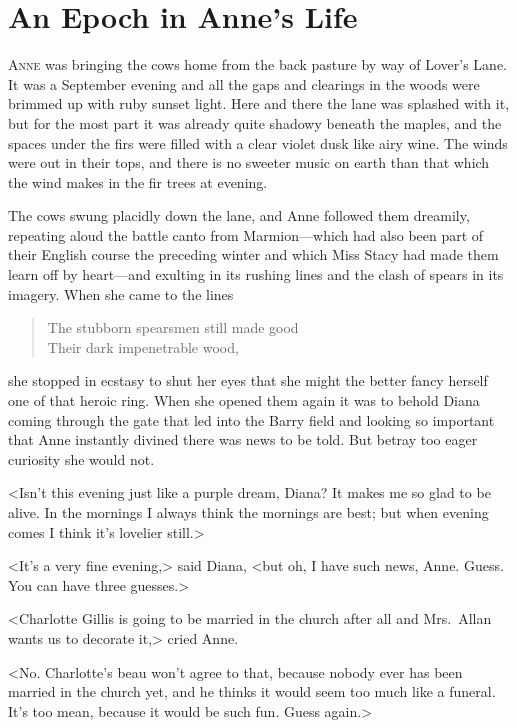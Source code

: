 \chapter{An Epoch in Anne's Life}

\lettrine{A}{nne} was bringing the cows home from the back pasture by way of Lover's Lane. It was a September evening and all the gaps and clearings in the woods were brimmed up with ruby sunset light. Here and there the lane was splashed with it, but for the most part it was already quite shadowy beneath the maples, and the spaces under the firs were filled with a clear violet dusk like airy wine. The winds were out in their tops, and there is no sweeter music on earth than that which the wind makes in the fir trees at evening.

The cows swung placidly down the lane, and Anne followed them dreamily, repeating aloud the battle canto from Marmion—which had also been part of their English course the preceding winter and which Miss Stacy had made them learn off by heart—and exulting in its rushing lines and the clash of spears in its imagery. When she came to the lines

\begin{verse}
The stubborn spearsmen still made good\\
Their dark impenetrable wood,\\
\end{verse}

she stopped in ecstasy to shut her eyes that she might the better fancy herself one of that heroic ring. When she opened them again it was to behold Diana coming through the gate that led into the Barry field and looking so important that Anne instantly divined there was news to be told. But betray too eager curiosity she would not.

<Isn't this evening just like a purple dream, Diana? It makes me so glad to be alive. In the mornings I always think the mornings are best; but when evening comes I think it's lovelier still.>

<It's a very fine evening,> said Diana, <but oh, I have such news, Anne. Guess. You can have three guesses.>

<Charlotte Gillis is going to be married in the church after all and Mrs.~Allan wants us to decorate it,> cried Anne.

<No. Charlotte's beau won't agree to that, because nobody ever has been married in the church yet, and he thinks it would seem too much like a funeral. It's too mean, because it would be such fun. Guess again.>

